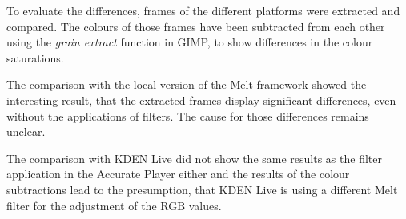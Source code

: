 \documentclass[../MasterThesis.tex]{subfiles}
\begin{document}
To evaluate the differences, frames of the different platforms were extracted and compared. 
The colours of those frames have been subtracted from each other using the \textit{grain extract} function in GIMP, to show differences in the colour saturations.


The comparison with the local version of the Melt framework showed the interesting result, that the extracted frames display significant differences, even without the applications of filters. The cause for those differences remains unclear.

The comparison with KDEN Live did not show the same results as the filter application in the Accurate Player either and the results of the colour subtractions lead to the presumption, that KDEN Live is using a different Melt filter for the adjustment of the RGB values.









\end{document}

